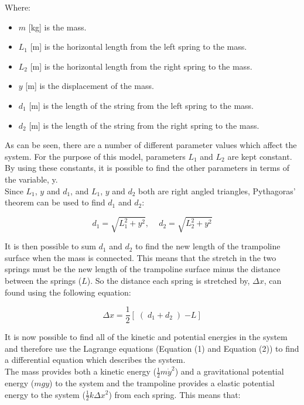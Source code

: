 \noindent Where:
\begin{itemize}
\item $m$ [kg] is the mass.
\item $L_1$ [m] is the horizontal length from the left spring to the mass.
\item $L_2$ [m] is the horizontal length from the right spring to the mass.
\item $y$ [m] is the displacement of the mass.
\item $d_1$  [m] is the length of the string from the left spring to the mass.
\item $d_2$  [m] is the length of the string from the right spring to the mass.
\end{itemize}




\noindent As can be seen, there are a number of different parameter values which affect the system. For the purpose of this model, parameters $L_1$ and $L_2$ are kept constant. By using these constants, it is possible to find the other parameters in terms of the variable, y. \\

\noindent Since $L_1$, $y$ and $d_1$, and $L_1$, $y$ and $d_2$ both are right angled triangles, Pythagoras' theorem \cite{pythagoras} can be used to find $d_1$ and $d_2$: 

\begin{equation}
d_1 = \sqrt{L_{1}^{2} + y^{2}},\,\,\,\,\,\,\, d_2 = \sqrt{L_{2}^{2} + y^{2}}
\end{equation}

\noindent It is then possible to sum $d_1$ and $d_2$ to find the new length of the trampoline surface when the mass is connected. This means that the stretch in the two springs must be the new length of the trampoline surface minus the distance between the springs ($L$). So the distance each spring is stretched by, $\Delta x$, can found using the following equation:

\begin{equation}
\Delta x = \frac{1}{2}\left[\middle(d_{1}+d_{2}\middle)-L\right] 
\end{equation}

\noindent It is now possible to find all of the kinetic and potential energies in the system and therefore use the Lagrange equations (Equation (1) and Equation (2)) to find a differential equation which describes the system. \\

\noindent The mass provides both a kinetic energy ($\frac{1}{2}m\dot{y}^2$) \cite{kinetic} and a gravitational potential energy ($mgy$) \cite{potentiale} to the system and the trampoline provides a elastic potential energy to the system ($\frac{1}{2}k\Delta x^2$) \cite{potentiale} from each spring. This means that:

